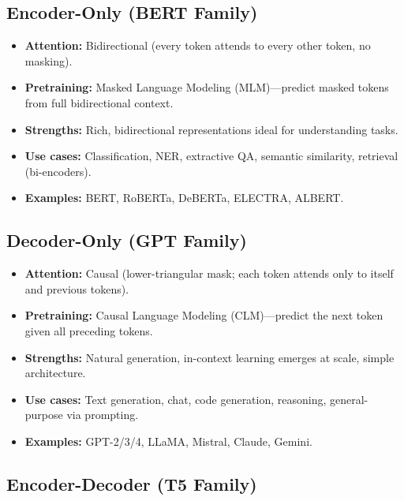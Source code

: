 \subsection{Encoder-Only (BERT Family)}

\begin{itemize}
    \item \textbf{Attention:} Bidirectional (every token attends to every other
          token, no masking).
    \item \textbf{Pretraining:} Masked Language Modeling (MLM)---predict masked
          tokens from full bidirectional context.
    \item \textbf{Strengths:} Rich, bidirectional representations ideal for
          understanding tasks.
    \item \textbf{Use cases:} Classification, NER, extractive QA, semantic
          similarity, retrieval (bi-encoders).
    \item \textbf{Examples:} BERT, RoBERTa, DeBERTa, ELECTRA, ALBERT.
\end{itemize}

\subsection{Decoder-Only (GPT Family)}

\begin{itemize}
    \item \textbf{Attention:} Causal (lower-triangular mask; each token attends
          only to itself and previous tokens).
    \item \textbf{Pretraining:} Causal Language Modeling (CLM)---predict the
          next token given all preceding tokens.
    \item \textbf{Strengths:} Natural generation, in-context learning emerges
          at scale, simple architecture.
    \item \textbf{Use cases:} Text generation, chat, code generation, reasoning,
          general-purpose via prompting.
    \item \textbf{Examples:} GPT-2/3/4, LLaMA, Mistral, Claude, Gemini.
\end{itemize}

\subsection{Encoder-Decoder (T5 Family)}

